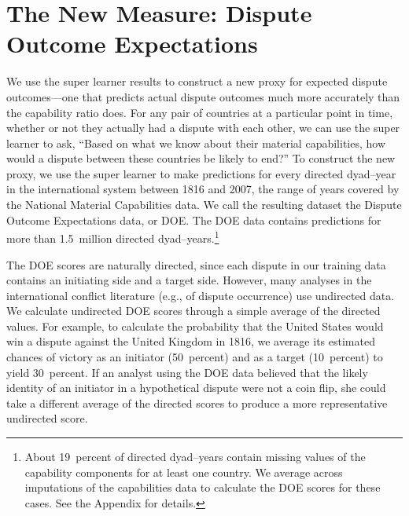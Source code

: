 \section{The New Measure: Dispute Outcome Expectations}
\label{sec:scores}

We use the super learner results to construct a new proxy for expected dispute outcomes---one that predicts actual dispute outcomes much more accurately than the capability ratio does.
For any pair of countries at a particular point in time, whether or not they actually had a dispute with each other, we can use the super learner to ask, ``Based on what we know about their material capabilities, how would a dispute between these countries be likely to end?''
To construct the new proxy, we use the super learner to make predictions for every directed dyad--year in the international system between 1816 and 2007, the range of years covered by the National Material Capabilities data.
We call the resulting dataset the Dispute Outcome Expectations data, or DOE.
The DOE data contains predictions for more than 1.5~million directed dyad--years.\footnote{
  About 19~percent of directed dyad--years contain missing values of the capability components for at least one country.
  We average across imputations of the capabilities data to calculate the DOE scores for these cases.
  See the Appendix for details.
}

The DOE scores are naturally directed, since each dispute in our training data contains an initiating side and a target side.
However, many analyses in the international conflict literature (e.g., of dispute occurrence) use undirected data.
We calculate undirected DOE scores through a simple average of the directed values.
For example, to calculate the probability that the United States would win a dispute against the United Kingdom in 1816, we average its estimated chances of victory as an initiator (50~percent) and as a target (10~percent) to yield 30~percent.
If an analyst using the DOE data believed that the likely identity of an initiator in a hypothetical dispute were not a coin flip, she could take a different average of the directed scores to produce a more representative undirected score.


